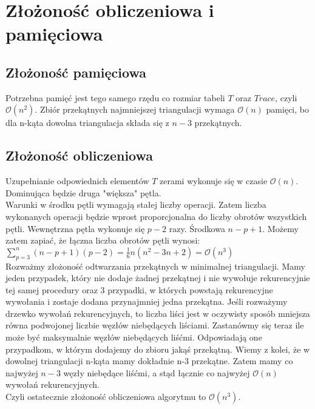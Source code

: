 \documentclass{article}
\begin{document}
\section{Złożoność obliczeniowa i pamięciowa}
\subsection{Złożoność pamięciowa}
Potrzebna pamięć jest tego samego rzędu co rozmiar tabeli $T$ oraz $Trace$, czyli $\mathcal{O}(n^2)$. Zbiór przekątnych najmniejszej triangulacji wymaga $\mathcal{O}(n)$ pamięci, bo dla n-kąta dowolna triangulacja składa się z $n-3$ przekątnych.

\subsection{Złożoność obliczeniowa}
Uzupełnianie odpowiednich elementów $T$ zerami wykonuje się w czasie $\mathcal{O}(n)$. Dominująca będzie druga "większa" pętla. \\
Warunki w środku pętli wymagają stałej liczby operacji. Zatem liczba wykonanych operacji będzie wprost proporcjonalna do liczby obrotów wszystkich pętli. Wewnętrzna pętla wykonuje się $p-2$ razy. Środkowa $n-p+1$. Możemy zatem zapiać, że łączna liczba obrotów pętli wynosi:\\
$\sum_{p=3}^n (n-p+1)(p-2) = \frac{1}{6} n (n^2 - 3 n + 2) = \mathcal{O}(n^3)$\\
Rozważmy złożoność odtwarzania przekątnych w minimalnej triangulacji. Mamy jeden przypadek, który nie dodaje żadnej przekątnej i nie wywołuje rekurencyjnie tej samej procedury oraz 3 przypadki, w których powstają rekurencyjne wywołania i zostaje dodana przynajmniej jedna przekątna. Jeśli rozważymy drzewko wywołań rekurencyjnych, to liczba liści jest w oczywisty sposób mniejsza równa podwojonej liczbie węzłów niebędących liściami. Zastanówmy się teraz ile może być maksymalnie węzłów niebędących liśćmi. Odpowiadają one przypadkom, w którym dodajemy do zbioru jakąś przekątną. Wiemy z kolei, że w dowolnej triangulacji n-kąta mamy dokładnie n-3 przekątne. Zatem mamy co najwyżej $n-3$ węzły niebędące liśćmi, a stąd łącznie co najwyżej $\mathcal{O}(n)$ wywołań rekurencyjnych.\\
Czyli ostatecznie złożoność obliczeniowa algorytmu to $\mathcal{O}(n^3)$.
\end{document}
